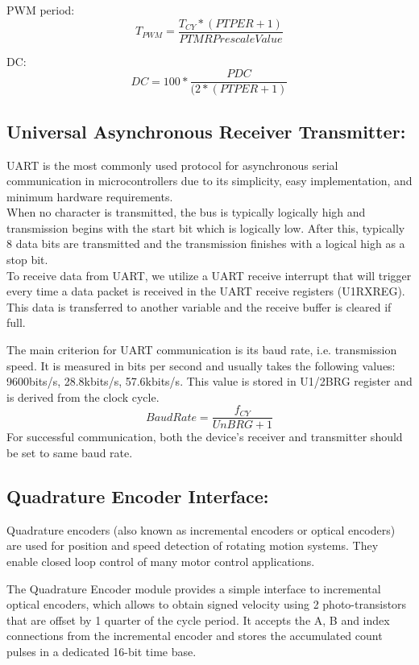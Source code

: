 PWM period:
$$T_{PWM}=\frac{T_{CY}*(PTPER+1)}{PTMR Prescale Value}$$

DC: 
$$DC=100* \frac{PDC}{(2*(PTPER+1)}$$


\subsection{Universal Asynchronous Receiver Transmitter:}

UART is the most commonly used protocol for asynchronous serial communication in microcontrollers due to its simplicity, easy implementation, and minimum hardware requirements.\\
When no character is transmitted, the bus is typically logically high and transmission begins with the start bit which is logically low. After this, typically 8 data bits are transmitted and the transmission finishes with a logical high as a stop bit.\\
To receive data from UART, we utilize a UART receive interrupt that will trigger every time a data packet is received in the UART receive registers (U1RXREG). This data is transferred to another variable and the receive buffer is cleared if full.

The main criterion for UART communication is its baud rate, i.e. transmission speed. It is measured in bits per second and usually takes the following values: 9600bits/s, 28.8kbits/s, 57.6kbits/s.
This value is stored in U1/2BRG register and is derived from the clock cycle.
$$BaudRate = \frac{f_{CY}}{UnBRG+1}$$
For successful communication, both the device’s receiver and transmitter should be set to same baud rate.


\subsection{Quadrature Encoder Interface:}

Quadrature encoders (also known as incremental encoders or optical encoders) are used for position and speed detection of rotating motion systems. They enable closed loop control of many motor control applications.

The Quadrature Encoder module provides a simple interface to incremental optical encoders, which allows to obtain signed velocity using 2 photo-transistors that are offset by 1 quarter of the cycle period. It accepts the A, B and index connections from the incremental encoder and stores the accumulated count pulses in a dedicated 16-bit time base.

